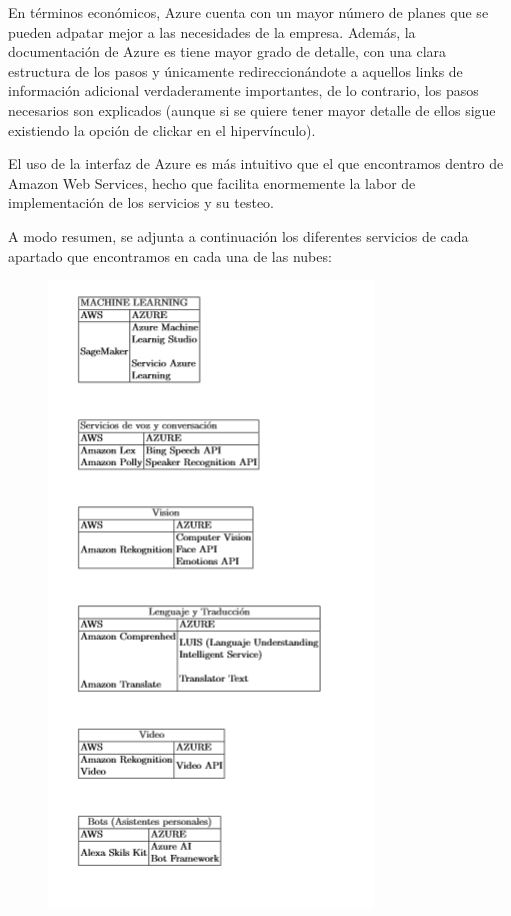 \documentclass[english,runningheads,a4paper]{llncs}[2018/03/10]
\begin{document}
    En términos económicos, Azure cuenta con un mayor número de planes que se 
    pueden adpatar mejor a las necesidades de la empresa. Además, la 
    documentación de Azure es tiene mayor grado de detalle, con una clara 
    estructura de los pasos y únicamente redireccionándote a aquellos links de 
    información adicional verdaderamente importantes, de lo contrario, los 
    pasos necesarios son explicados (aunque si se quiere tener mayor detalle de 
    ellos sigue existiendo la opción de clickar en el hipervínculo).
    
    El uso de la interfaz de Azure es más intuitivo que el que encontramos 
    dentro de Amazon Web Services, hecho que facilita enormemente la labor de 
    implementación de los servicios y su testeo.
    
    A modo resumen, se adjunta a continuación los diferentes servicios de cada 
    apartado que encontramos en cada una de las nubes:
    
    \begin{figure}[h!]
        \centering
        \includegraphics[scale=0.7]{./IA/AZURE/tablaResumen.png}
        \caption{}
    \end{figure}
    
\end{document}
